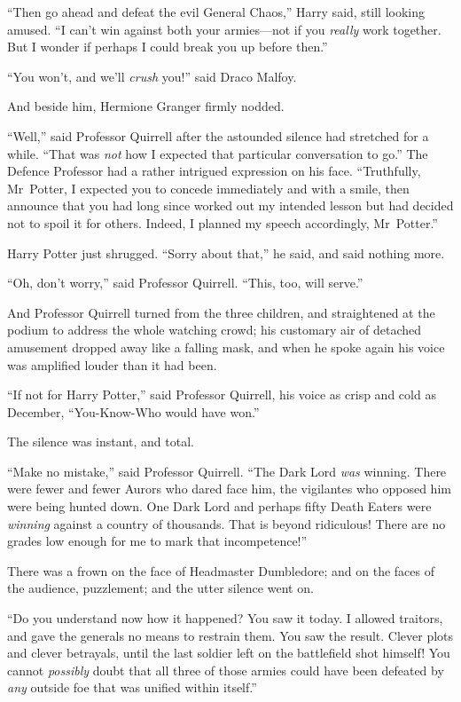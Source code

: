“Then go ahead and defeat the evil General Chaos,” Harry said, still looking amused. “I can’t win against both your armies—not if you \emph{really} work together. But I wonder if perhaps I could break you up before then.”

“You won’t, and we’ll \emph{crush} you!” said Draco Malfoy.

And beside him, Hermione Granger firmly nodded.

“Well,” said Professor Quirrell after the astounded silence had stretched for a while. “That was \emph{not} how I expected that particular conversation to go.” The Defence Professor had a rather intrigued expression on his face. “Truthfully, Mr~Potter, I expected you to concede immediately and with a smile, then announce that you had long since worked out my intended lesson but had decided not to spoil it for others. Indeed, I planned my speech accordingly, Mr~Potter.”

Harry Potter just shrugged. “Sorry about that,” he said, and said nothing more.

“Oh, don’t worry,” said Professor Quirrell. “This, too, will serve.”

And Professor Quirrell turned from the three children, and straightened at the podium to address the whole watching crowd; his customary air of detached amusement dropped away like a falling mask, and when he spoke again his voice was amplified louder than it had been.

“If not for Harry Potter,” said Professor Quirrell, his voice as crisp and cold as December, “You-Know-Who would have won.”

The silence was instant, and total.

\later

“Make no mistake,” said Professor Quirrell. “The Dark Lord \emph{was} winning. There were fewer and fewer Aurors who dared face him, the vigilantes who opposed him were being hunted down. One Dark Lord and perhaps fifty Death Eaters were \emph{winning} against a country of thousands. That is beyond ridiculous! There are no grades low enough for me to mark that incompetence!”

There was a frown on the face of Headmaster Dumbledore; and on the faces of the audience, puzzlement; and the utter silence went on.

“Do you understand now how it happened? You saw it today. I allowed traitors, and gave the generals no means to restrain them. You saw the result. Clever plots and clever betrayals, until the last soldier left on the battlefield shot himself! You cannot \emph{possibly} doubt that all three of those armies could have been defeated by \emph{any} outside foe that was unified within itself.”

